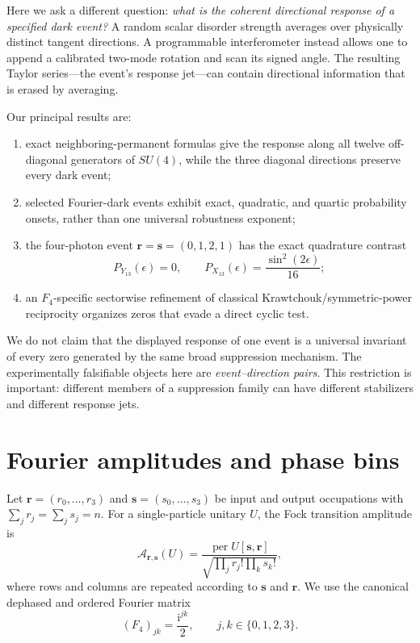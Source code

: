 \documentclass[aps,pra,reprint,amsmath,amssymb,superscriptaddress,longbibliography]{revtex4-2}
\newcommand{\Ffour}{F_{4}}
\newcommand{\ii}{\mathrm{i}}
\newcommand{\per}{\operatorname{per}}
\begin{document}
Here we ask a different question: \emph{what is the coherent directional
response of a specified dark event?}  A random scalar disorder strength
averages over physically distinct tangent directions.  A programmable
interferometer instead allows one to append a calibrated two-mode rotation
and scan its signed angle.  The resulting Taylor series---the event's response
jet---can contain directional information that is erased by averaging.

Our principal results are:
\begin{enumerate}
\item exact neighboring-permanent formulas give the response along all twelve
off-diagonal generators of $SU(4)$, while the three diagonal directions
preserve every dark event;
\item selected Fourier-dark events exhibit exact, quadratic, and quartic
probability onsets, rather than one universal robustness exponent;
\item the four-photon event
$\bm r=\bm s=(0,1,2,1)$ has the exact quadrature contrast
\begin{equation}
 P_{Y_{13}}(\epsilon)=0,\qquad
 P_{X_{13}}(\epsilon)=\frac{\sin^2(2\epsilon)}{16};
\label{eq:headline}
\end{equation}
\item an $F_4$-specific sectorwise refinement of classical
Krawtchouk/symmetric-power reciprocity
\cite{Feinsilver2005,Chami2014,ChenLouck1998} organizes zeros that evade a
direct cyclic test.
\end{enumerate}

We do not claim that the displayed response of one event is a universal
invariant of every zero generated by the same broad suppression mechanism.
The experimentally falsifiable objects here are \emph{event--direction
pairs}.  This restriction is important: different members of a suppression
family can have different stabilizers and different response jets.

\section{Fourier amplitudes and phase bins}
\label{sec:setup}

Let $\bm r=(r_0,\ldots,r_3)$ and $\bm s=(s_0,\ldots,s_3)$ be input and
output occupations with $\sum_jr_j=\sum_js_j=n$.  For a single-particle
unitary $U$, the Fock transition amplitude is
\begin{equation}
\mathcal A_{\bm r,\bm s}(U)=
\frac{\per U[\bm s,\bm r]}
{\sqrt{\prod_jr_j!\prod_ks_k!}},
\label{eq:fock-amplitude}
\end{equation}
where rows and columns are repeated according to $\bm s$ and $\bm r$.
We use the canonical dephased and ordered Fourier matrix
\begin{equation}
(\Ffour)_{jk}=\frac{\ii^{jk}}{2},\qquad j,k\in\{0,1,2,3\}.
\end{equation}
\end{document}
